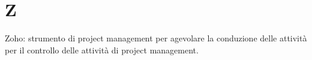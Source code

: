 \section{Z}
Zoho:  strumento di project management per agevolare la conduzione delle attività per il controllo delle attività di project management.

